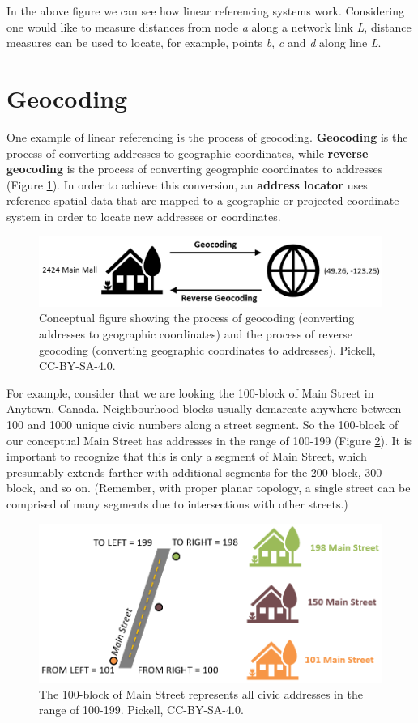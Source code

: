 \documentclass[
]{book}
\begin{document}
In the above figure we can see how linear referencing systems work. Considering one would like to measure distances from node \emph{a} along a network link \emph{L}, distance measures can be used to locate, for example, points \emph{b}, \emph{c} and \emph{d} along line \emph{L}.

\section{Geocoding}\label{geocoding}

One example of linear referencing is the process of geocoding. \textbf{Geocoding} is the process of converting addresses to geographic coordinates, while \textbf{reverse geocoding} is the process of converting geographic coordinates to addresses (Figure \ref{fig:8-geocoding}). In order to achieve this conversion, an \textbf{address locator} uses reference spatial data that are mapped to a geographic or projected coordinate system in order to locate new addresses or coordinates.

\begin{figure}
\includegraphics[width=0.75\linewidth]{images/08-geocoding} \caption{Conceptual figure showing the process of geocoding (converting addresses to geographic coordinates) and the process of reverse geocoding (converting geographic coordinates to addresses). Pickell, CC-BY-SA-4.0.}\label{fig:8-geocoding}
\end{figure}

For example, consider that we are looking the 100-block of Main Street in Anytown, Canada. Neighbourhood blocks usually demarcate anywhere between 100 and 1000 unique civic numbers along a street segment. So the 100-block of our conceptual Main Street has addresses in the range of 100-199 (Figure \ref{fig:8-left-right-side}). It is important to recognize that this is only a segment of Main Street, which presumably extends farther with additional segments for the 200-block, 300-block, and so on. (Remember, with proper planar topology, a single street can be comprised of many segments due to intersections with other streets.)

\begin{figure}
\includegraphics[width=0.75\linewidth]{images/08-left-right-side} \caption{The 100-block of Main Street represents all civic addresses in the range of 100-199. Pickell, CC-BY-SA-4.0.}\label{fig:8-left-right-side}
\end{figure}
\end{document}
